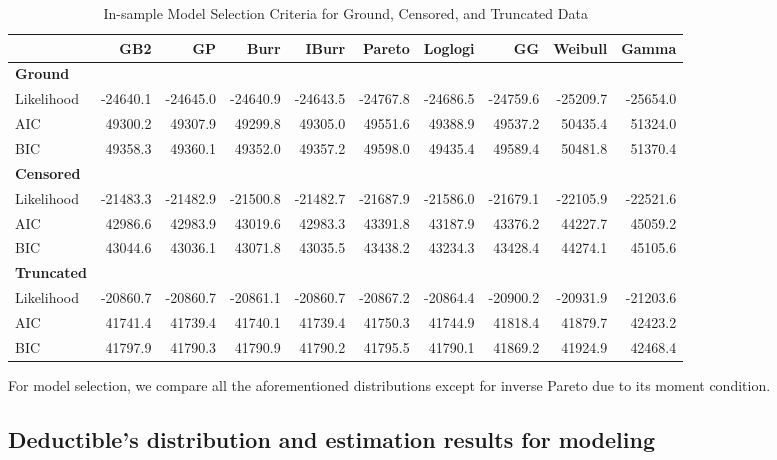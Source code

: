 \documentclass[11pt]{article}
\newcommand{\rev}[1]{{\color{blue}#1}}
\begin{document}
\begin{table}[h!]
\renewcommand{\tabcolsep}{2mm}
\renewcommand{\arraystretch}{0.75}
\centering
\footnotesize
\begin{tabular}{lrrrrrrrrr}
\toprule
& \textbf{GB2} & \textbf{GP} & \textbf{Burr} & \textbf{IBurr} & \textbf{Pareto} & \textbf{Loglogi} & \textbf{GG} & \textbf{Weibull} & \textbf{Gamma} \\
\midrule
\textbf{Ground} \\
Likelihood & -24640.1 & -24645.0 & -24640.9 & -24643.5 & -24767.8 & -24686.5 & -24759.6 & -25209.7 & -25654.0 \\
AIC & 49300.2 & 49307.9 & 49299.8 & 49305.0 & 49551.6 & 49388.9 & 49537.2 & 50435.4 & 51324.0 \\
BIC & 49358.3 & 49360.1 & 49352.0 & 49357.2 & 49598.0 & 49435.4 & 49589.4 & 50481.8 & 51370.4 \\
\midrule
\textbf{Censored} \\
Likelihood & -21483.3 & -21482.9 & -21500.8 & -21482.7 & -21687.9 & -21586.0 & -21679.1 & -22105.9 & -22521.6 \\
AIC & 42986.6 & 42983.9 & 43019.6 & 42983.3 & 43391.8 & 43187.9 & 43376.2 & 44227.7 & 45059.2 \\
BIC & 43044.6 & 43036.1 & 43071.8 & 43035.5 & 43438.2 & 43234.3 & 43428.4 & 44274.1 & 45105.6 \\
\midrule
\textbf{Truncated} \\
Likelihood & -20860.7 & -20860.7 & -20861.1 & -20860.7 & -20867.2 & -20864.4 & -20900.2 & -20931.9 & -21203.6 \\
AIC & 41741.4 & 41739.4 & 41740.1 & 41739.4 & 41750.3 & 41744.9 & 41818.4 & 41879.7 & 42423.2 \\
BIC & 41797.9 & 41790.3 & 41790.9 & 41790.2 & 41795.5 & 41790.1 & 41869.2 & 41924.9 & 42468.4 \\
\bottomrule
\end{tabular}
\caption{In-sample Model Selection Criteria for Ground, Censored, and Truncated Data}
\label{tab:model_comparison}
\end{table}

For model selection, we compare all the \rev{aforementioned} distributions except for inverse Pareto due to its moment condition.
\FloatBarrier

\subsection*{Deductible's distribution and estimation results for modeling}
\end{document}
